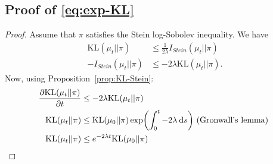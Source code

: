 \documentclass[runningheads,a4paper]{llncs}
\newcommand{\KL}{\mathrm{KL}}
\newcommand{\diff}[2]{\frac{\partial #1}{\partial #2}}
\renewcommand{\d}{\: \mathrm{d}}
\DeclarePairedDelimiter{\pare}{(}{)}
\begin{document}
\subsection{Proof of \ref{eq:exp-KL}}\label{pro:exp-KL}
\begin{proof}
  Assume that $\pi$ satisfies the Stein log-Sobolev inequality.
  We have
  \begin{align*}
    \KL(\mu_t || \pi) &\leq \frac{1}{2\lambda} I_{Stein}(\mu_t || \pi)\\
    -I_{Stein}(\mu_t || \pi) &\leq -2\lambda \KL(\mu_t || \pi).
  \end{align*}
  Now, using Proposition~\ref{prop:KL-Stein}:
  \begin{align*}
    \diff{\KL(\mu_t || \pi)}{t} &\leq -2\lambda \KL(\mu_t || \pi) \\
    \KL(\mu_t || \pi) &\leq \KL(\mu_0 || \pi) \exp \pare*{ \int_0^t -2 \lambda \d s }
    \text{ (Gronwall's lemma) } \\
    \KL(\mu_t || \pi) &\leq e^{-2\lambda t} \KL(\mu_0 || \pi)
  \end{align*}
    
\end{proof}
\end{document}
